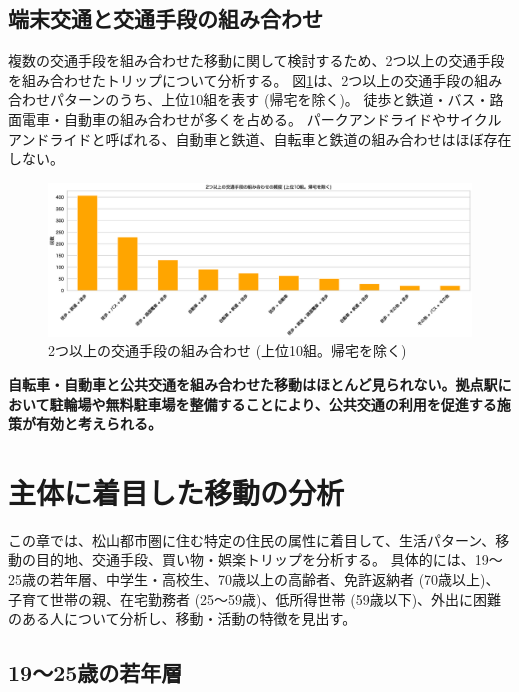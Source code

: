 \documentclass[a4paper,12pt, uplatex]{jsbook}
\begin{document}
\section{端末交通と交通手段の組み合わせ}
複数の交通手段を組み合わせた移動に関して検討するため、2つ以上の交通手段を組み合わせたトリップについて分析する。
図\ref{fig:transit_combination}は、2つ以上の交通手段の組み合わせパターンのうち、上位10組を表す (帰宅を除く)。
徒歩と鉄道・バス・路面電車・自動車の組み合わせが多くを占める。
パークアンドライドやサイクルアンドライドと呼ばれる、自動車と鉄道、自転車と鉄道の組み合わせはほぼ存在しない。
%
\begin{figure}[H]
    \centering
    \includegraphics[width=1.0\textwidth]{picture/transit_combination.eps}
    \caption{2つ以上の交通手段の組み合わせ (上位10組。帰宅を除く)}
    \label{fig:transit_combination}
\end{figure}

\color{red}
\begin{framed}
\noindent
\textbf{\large 自転車・自動車と公共交通を組み合わせた移動はほとんど見られない。拠点駅において駐輪場や無料駐車場を整備することにより、公共交通の利用を促進する施策が有効と考えられる。
}
\end{framed}
\color{black}

\clearpage
\chapter{主体に着目した移動の分析}
この章では、松山都市圏に住む特定の住民の属性に着目して、生活パターン、移動の目的地、交通手段、買い物・娯楽トリップを分析する。
具体的には、19〜25歳の若年層、中学生・高校生、70歳以上の高齢者、免許返納者 (70歳以上)、子育て世帯の親、在宅勤務者 (25〜59歳)、低所得世帯 (59歳以下)、外出に困難のある人について分析し、移動・活動の特徴を見出す。

\section{19〜25歳の若年層}
\end{document}
